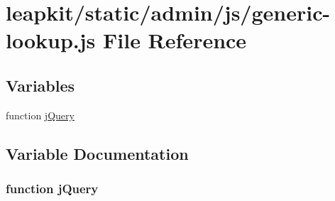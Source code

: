 \hypertarget{generic-lookup_8js}{\section{leapkit/static/admin/js/generic-\/lookup.js File Reference}
\label{generic-lookup_8js}
}
\subsection*{Variables}
\begin{DoxyCompactItemize}
\item 
function \hyperlink{generic-lookup_8js_a1e853eabf9d8ee3ac2700c9a2ddda672}{j\-Query}
\end{DoxyCompactItemize}


\subsection{Variable Documentation}
\hypertarget{generic-lookup_8js_a1e853eabf9d8ee3ac2700c9a2ddda672}{
\subsubsection[{j\-Query}]{\setlength{\rightskip}{0pt plus 5cm}function j\-Query}}\label{generic-lookup_8js_a1e853eabf9d8ee3ac2700c9a2ddda672}
